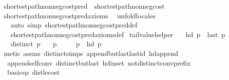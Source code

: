 \begin{isabellebody}
\isamarkupfalse%
\ shortest{\isacharunderscore}path{\isacharunderscore}non{\isacharunderscore}neg{\isacharunderscore}cost{\isacharunderscore}pred\ {\isasymsubseteq}\ shortest{\isacharunderscore}path{\isacharunderscore}non{\isacharunderscore}neg{\isacharunderscore}cost\isanewline
%
\isadelimproof
%
\endisadelimproof
%
\isatagproof
{}\isamarkupfalse%
\ shortest{\isacharunderscore}path{\isacharunderscore}non{\isacharunderscore}neg{\isacharunderscore}cost{\isacharunderscore}pred{\isacharunderscore}axioms\ \isanewline
{}\isamarkupfalse%
\ unfold{\isacharunderscore}locales\ \isanewline
\ \ \ {\isacharparenleft}auto\ simp{\isacharcolon}\ shortest{\isacharunderscore}path{\isacharunderscore}non{\isacharunderscore}neg{\isacharunderscore}cost{\isacharunderscore}pred{\isacharunderscore}def\ \isanewline
\ \ \ shortest{\isacharunderscore}path{\isacharunderscore}non{\isacharunderscore}neg{\isacharunderscore}cost{\isacharunderscore}pred{\isacharunderscore}axioms{\isacharunderscore}def{\isacharparenright}%
\endisatagproof
{\isafoldproof}%
%
\isadelimproof
\isanewline
%
\endisadelimproof
\isanewline
{}\isamarkupfalse%
\ tail{\isacharunderscore}value{\isacharunderscore}helper{\isacharcolon}\isanewline
\ \ \ {\isachardoublequoteopen}hd\ p\ {\isacharequal}\ last\ p{\isachardoublequoteclose}\isanewline
\ \ \ {\isachardoublequoteopen}distinct\ p{\isachardoublequoteclose}\isanewline
\ \ \ {\isachardoublequoteopen}p\ {\isasymnoteq}\ {\isacharbrackleft}{\isacharbrackright}{\isachardoublequoteclose}\isanewline
\ \ \ {\isachardoublequoteopen}p\ {\isacharequal}\ {\isacharbrackleft}hd\ p{\isacharbrackright}{\isachardoublequoteclose}\isanewline
%
\isadelimproof
%
\endisadelimproof
%
\isatagproof
{}\isamarkupfalse%
\ {\isacharparenleft}metis\ assms\ distinct{\isachardot}simps{\isacharparenleft}{}{\isacharparenright}\ append{\isacharunderscore}butlast{\isacharunderscore}last{\isacharunderscore}id\ hd{\isacharunderscore}append\isanewline
\ \ append{\isacharunderscore}self{\isacharunderscore}conv{}\ distinct{\isacharunderscore}butlast\ hd{\isacharunderscore}in{\isacharunderscore}set\ not{\isacharunderscore}distinct{\isacharunderscore}conv{\isacharunderscore}prefix{\isacharparenright}%
\endisatagproof
{\isafoldproof}%
%
\isadelimproof
\isanewline
%
\endisadelimproof
\isanewline
{}\isamarkupfalse%
\ {\isacharparenleft}\ basic{\isacharunderscore}sp{\isacharparenright}\ dist{\isacharunderscore}le{\isacharunderscore}cost{\isacharcolon}\isanewline

\end{isabellebody}
